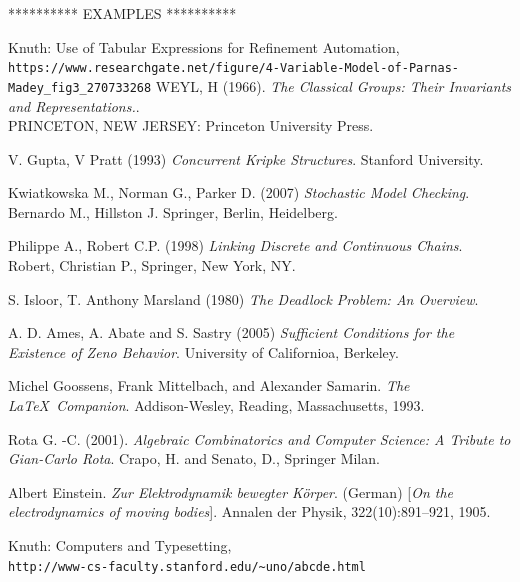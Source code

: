 \documentclass{article}%
\begin{document}
\newpage
********** EXAMPLES **********
\begin{thebibliography}{9}

Knuth: Use of Tabular Expressions for Refinement Automation,
\\\texttt{https://www.researchgate.net/figure/4-Variable-Model-of-Parnas-Madey\_fig3\_270733268}
WEYL, H (1966).
\textit{The Classical Groups: Their Invariants and Representations.}.\\ 
PRINCETON, NEW JERSEY: Princeton University Press.

V. Gupta, V Pratt (1993)
\textit{Concurrent Kripke Structures}. 
Stanford University.

Kwiatkowska M., Norman G., Parker D. (2007)
\textit{Stochastic Model Checking}. 
Bernardo M., Hillston J. Springer, Berlin, Heidelberg.

Philippe A., Robert C.P. (1998)  
\textit{Linking Discrete and Continuous Chains}. 
Robert, Christian P., Springer, New York, NY.

S. Isloor, T. Anthony Marsland (1980)
\textit{The Deadlock Problem: An Overview}. 

A. D. Ames, A. Abate and S. Sastry (2005)
\textit{Sufficient Conditions for the Existence of Zeno Behavior}.
University of Californioa, Berkeley.

Michel Goossens, Frank Mittelbach, and Alexander Samarin. 
\textit{The \LaTeX\ Companion}. 
Addison-Wesley, Reading, Massachusetts, 1993.

Rota G. -C. (2001).
\textit{Algebraic Combinatorics and Computer Science: A Tribute to Gian-Carlo Rota}.
Crapo, H. and Senato, D., Springer Milan.

Albert Einstein. 
\textit{Zur Elektrodynamik bewegter K{\"o}rper}. (German) 
[\textit{On the electrodynamics of moving bodies}]. 
Annalen der Physik, 322(10):891–921, 1905.

Knuth: Computers and Typesetting,
\\\texttt{http://www-cs-faculty.stanford.edu/\~{}uno/abcde.html}

\end{thebibliography}
\end{document}
